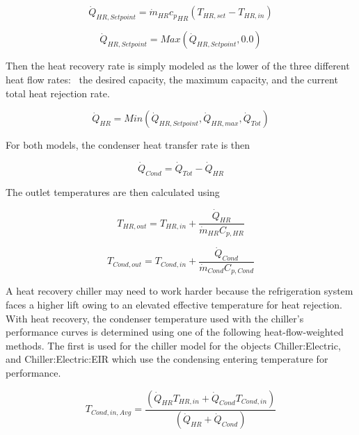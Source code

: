 \begin{equation}
{\dot Q_{HR,Setpoint}} = {\dot m_{HR}}{c_p}_{HR}\left( {{T_{HR,set}} - {T_{HR,in}}} \right)
\end{equation}

\begin{equation}
{\dot Q_{HR,Setpoint}} = Max\left( {{{\dot Q}_{HR,Setpoint}},0.0} \right)
\end{equation}

Then the heat recovery rate is simply modeled as the lower of the three different heat flow rates:~ the desired capacity, the maximum capacity, and the current total heat rejection rate.

\begin{equation}
{\dot Q_{HR}} = Min\left( {{{\dot Q}_{HR,Setpoint}},{{\dot Q}_{HR,max}},{{\dot Q}_{Tot}}} \right)
\end{equation}

For both models, the condenser heat transfer rate is then

\begin{equation}
{\dot Q_{Cond}} = {\dot Q_{Tot}} - {\dot Q_{HR}}
\end{equation}

The outlet temperatures are then calculated using

\begin{equation}
  T_{HR,out} = T_{HR,in} + \frac{\dot{Q}_{HR}}{\dot{m}_{HR}C_{p,HR}}
\end{equation}

\begin{equation}
  T_{Cond,out} = T_{Cond,in} + \frac{\dot{Q}_{Cond}}{\dot{m}_{Cond}C_{p,Cond}}
\end{equation}

A heat recovery chiller may need to work harder because the refrigeration system faces a higher lift owing to an elevated effective temperature for heat rejection.~ With heat recovery, the condenser temperature used with the chiller's performance curves is determined using one of the following heat-flow-weighted methods. The first is used for the chiller model for the objects Chiller:Electric, and Chiller:Electric:EIR which use the condensing entering temperature for performance.

\begin{equation}
{T_{Cond,in,Avg}} = \frac{{\left( {{{\dot Q}_{HR}}{T_{HR,in}} + {{\dot Q}_{Cond}}{T_{Cond,in}}} \right)}}{{\left( {{{\dot Q}_{HR}} + {{\dot Q}_{Cond}}} \right)}}
\end{equation}

